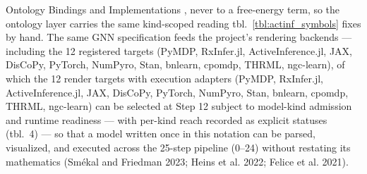 \documentclass[
  ignorenonframetext,
]{beamer}
\begin{document}
\begin{frame}{Ontology Bindings and
Implementations}
, never to a free-energy term, so the
ontology layer carries the same kind-scoped reading
tbl.~\ref{tbl:actinf_symbols} fixes by hand. The same GNN specification
feeds the project's rendering backends --- including the 12 registered
targets (PyMDP, RxInfer.jl, ActiveInference.jl, JAX, DisCoPy, PyTorch,
NumPyro, Stan, bnlearn, cpomdp, THRML, ngc-learn), of which the 12
render targets with execution adapters (PyMDP, RxInfer.jl,
ActiveInference.jl, JAX, DisCoPy, PyTorch, NumPyro, Stan, bnlearn,
cpomdp, THRML, ngc-learn) can be selected at Step 12 subject to
model-kind admission and runtime readiness --- with per-kind reach
recorded as explicit statuses (tbl.~4) ---
so that a model written once in this notation can be parsed, visualized,
and executed across the 25-step pipeline (0--24) without restating its
mathematics (Smékal and Friedman 2023; Heins et al. 2022; Felice et al.
2021).
\end{frame}
\end{document}
